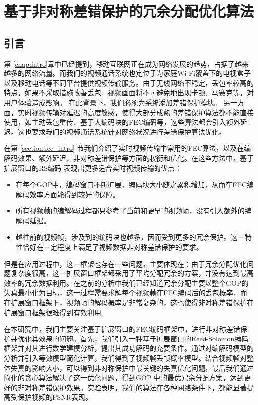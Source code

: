 \chapter{基于非对称差错保护的冗余分配优化算法}
\label{chap:fec}

\section{引言}
第 \ref{chap:intro}章中已经提到，移动互联网正在成为网络发展的趋势，占据了越来越多的网络流量。而我们的视频通话系统也定位于为家庭Wi-Fi覆盖下的电视盒子以及移动电话等不同平台提供视频传输服务。由于无线网络不稳定，丢包率较高的特点，如果不采取措施改善丢包，视频画面将不可避免地出现卡顿、马赛克等，对用户体验造成影响。
在此背景下，我们必须为系统添加差错保护模块。
另一方面，实时视频传输对延迟的高度敏感，使得大部分成熟的差错保护算法都不能直接使用，如主动丢包重传、基于大编码块的FEC编码等，这些算法都会引入额外延迟。这也要求我们的视频通话系统针对网络状况进行差错保护算法优化。

在第 \ref{section:fec_intro} 节我们介绍了实时视频传输中常用的FEC算法，以及在编解码效果、额外延迟、非对称差错保护等方面的权衡和优化。在这些方法中，基于扩展窗口的RS编码 \cite{sejdinovic2009expanding} 表现出更多适合实时视频传输的优点：
\begin{itemize}
    \item 在每个GOP中，编码窗口不断扩展，编码块大小随之累积增加，从而在FEC编解码效率方面能得到较好的保障。
    \item 所有视频帧的编解码过程都只参考了当前和更早的视频帧，没有引入额外的编解码延迟。
    \item 越往前的视频帧，涉及到的编码块也越多，因而受到更多的冗余保护。这一特性恰好在一定程度上满足了视频数据非对称差错保护的要求。
\end{itemize}

但是在应用过程中，这一框架也存在一些问题，主要体现在：由于冗余分配优化问题复杂度很高，这一扩展窗口框架都采用了平均分配冗余的方案，并没有达到最高效率的冗余数据利用。在之前的分析中我们已经知道冗余分配主要以整个GOP的失真最小化为目标，这一过程需要求解每个视频帧在FEC编码后的丢包概率，而在扩展窗口框架下，视频帧的解码概率是非常复杂的，这也使得非对称差错保护在扩展窗口框架很难得到有效利用。

在本研究中，我们主要关注基于扩展窗口的FEC编码框架中，进行非对称差错保护并优化其效果的问题。首先，我们引入一种基于扩展窗口的Reed-Solomon编码框架并对其进行数学建模分析，提出其成功解码的充要条件。通过对编解码模型的分析并引入等效模型简化计算，我们得到了视频帧丢帧概率模型。结合视频帧对整体失真的影响大小，可以得到非对称保护中最关键的失真优化问题。最后我们通过简化的贪心算法解决了这一优化问题，得到GOP 中的最优冗余分配方案，达到更好的非对称差错保护效果。实验表明，我们的算法在各种网络条件下，都能显著提高受保护视频的PSNR表现。


